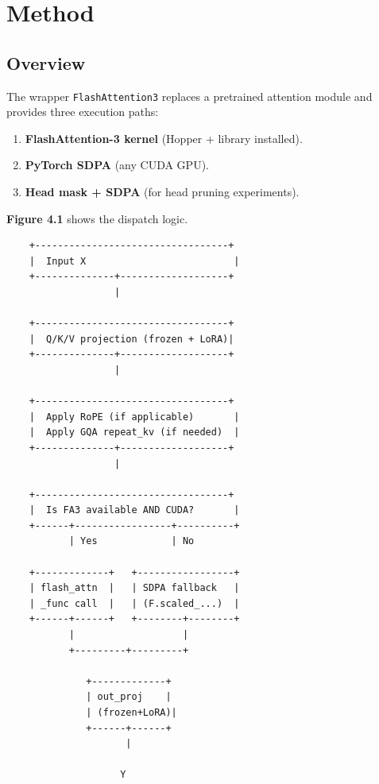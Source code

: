 \section{Method}

\subsection{Overview}

The wrapper \texttt{FlashAttention3} replaces a pretrained attention module and 
provides three execution paths:

\begin{enumerate}
\item \textbf{FlashAttention-3 kernel} (Hopper + library installed).
\item \textbf{PyTorch SDPA} (any CUDA GPU).
\item \textbf{Head mask + SDPA} (for head pruning experiments).

\end{enumerate}
\textbf{Figure 4.1} shows the dispatch logic.

\begin{lstlisting}
    +----------------------------------+
    |  Input X                          |
    +--------------+-------------------+
                   |
                    
    +----------------------------------+
    |  Q/K/V projection (frozen + LoRA)|
    +--------------+-------------------+
                   |
                    
    +----------------------------------+
    |  Apply RoPE (if applicable)       |
    |  Apply GQA repeat_kv (if needed)  |
    +--------------+-------------------+
                   |
                    
    +----------------------------------+
    |  Is FA3 available AND CUDA?       |
    +------+-----------------+----------+
           | Yes             | No
                              
    +-------------+   +-----------------+
    | flash_attn  |   | SDPA fallback   |
    | _func call  |   | (F.scaled_...)  |
    +------+------+   +--------+--------+
           |                   |
           +---------+---------+
                      
              +-------------+
              | out_proj    |
              | (frozen+LoRA)|
              +------+------+
                     |
                      
                    Y
\end{lstlisting}

